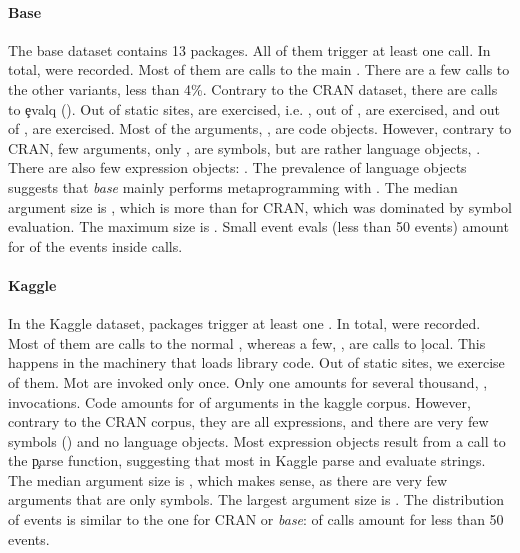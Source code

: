 \documentclass[acmsmall]{acmart}
\begin{document}
\paragraph{Base} The base dataset contains 13 packages. All of them trigger at least one \eval call. In total, \baseAllcalls \eval  were recorded. Most of them are calls to the main \eval. There are a few calls to the other variants, less than 4\%. Contrary to the CRAN dataset, there are calls to \c{evalq} (\baseEvalqs). Out of \baseStaticeval \eval static sites, \baseTriggeredeval are exercised, i.e. \baseTriggeredevalpct, out of \baseStaticevalq, \baseTriggeredevalq are exercised, and out of \baseStaticevalparent, \baseTriggeredevalparent are exercised.  Most of the arguments, \baseCodepercent,  are code objects. However, contrary to CRAN, few arguments, only \baseSymbolpercent, are symbols, but are rather language objects, \baseLanguagepercent. There are also few expression objects: \baseExpressionpercent. The prevalence of language objects suggests that \emph{base} mainly performs metaprogramming with \eval.
The median argument size is \baseMedianszeval, which is more than for CRAN, which was dominated by symbol evaluation. The maximum size is \baseMaxszeval. Small event evals (less than 50 events) amount for \baseSmalleventspct of the events inside \eval calls.


\paragraph{Kaggle} In the Kaggle dataset, \kaggleNbruns packages trigger at least one \eval. In total, \kaggleAllcalls \eval were recorded. Most of them are calls to the normal \eval, whereas a few, \kaggleLocals, are calls to \c{local}. This happens in the machinery that loads library code.
Out of \kaggleStaticeval static \eval sites, we exercise \kaggleTriggeredeval of them. Mot \eval are invoked only once. Only one \eval amounts for several thousand, \kaggleMaxcalls,  invocations. Code amounts for \kaggleCodepercent of arguments in the kaggle corpus. However, contrary to the CRAN corpus, they are all expressions, and there are very few symbols (\kaggleSymbolpercent) and no language objects. Most expression objects result from a call to the \c{parse} function, suggesting that most \eval in Kaggle parse and evaluate strings. The median argument size is \kaggleMedianszeval, which makes sense, as there are very few arguments that are only symbols. The largest argument size is \kaggleMaxszeval. The distribution of events is similar to the one for CRAN or \emph{base}: \kaggleSmalleventspct of \eval calls amount for less than 50 events.
\end{document}
